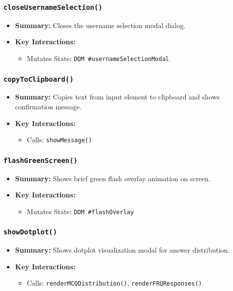 \documentclass[11pt,letterpaper]{article}
\begin{document}
\subsubsection{\texttt{closeUsernameSelection()}}
\begin{itemize}
    \item \textbf{Summary:} Closes the username selection modal dialog.
    \item \textbf{Key Interactions:}
    \begin{itemize}
        \item Mutates State: \texttt{DOM \#usernameSelectionModal}
    \end{itemize}
\end{itemize}

\subsubsection{\texttt{copyToClipboard()}}
\begin{itemize}
    \item \textbf{Summary:} Copies text from input element to clipboard and shows confirmation message.
    \item \textbf{Key Interactions:}
    \begin{itemize}
        \item Calls: \texttt{showMessage()}
    \end{itemize}
\end{itemize}

\subsubsection{\texttt{flashGreenScreen()}}
\begin{itemize}
    \item \textbf{Summary:} Shows brief green flash overlay animation on screen.
    \item \textbf{Key Interactions:}
    \begin{itemize}
        \item Mutates State: \texttt{DOM \#flashOverlay}
    \end{itemize}
\end{itemize}

\subsubsection{\texttt{showDotplot()}}
\begin{itemize}
    \item \textbf{Summary:} Shows dotplot visualization modal for answer distribution.
    \item \textbf{Key Interactions:}
    \begin{itemize}
        \item Calls: \texttt{renderMCQDistribution()}, \texttt{renderFRQResponses()}
    \end{itemize}
\end{itemize}
\end{document}
